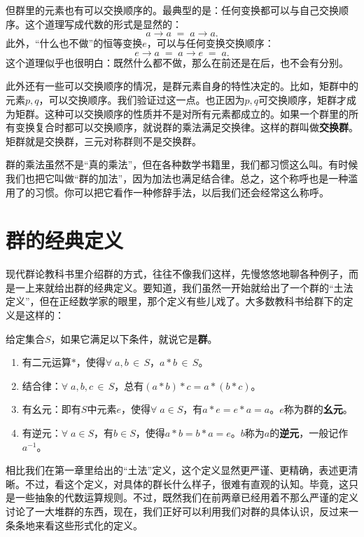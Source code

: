 \documentclass[12pt,UTF8,fontset=none]{ctexbook}
\begin{document}
但群里的元素也有可以交换顺序的。最典型的是：任何变换都可以与自己交换顺序。这个道理写成代数的形式是显然的：
$$ a\rightarrow a \; = \; a\rightarrow a.$$
此外，“什么也不做”的恒等变换$e$，可以与任何变换交换顺序：
$$ e\rightarrow a \; = \; a\rightarrow e \; = \;a.$$
这个道理似乎也很明白：既然什么都不做，那么在前还是在后，也不会有分别。

此外还有一些可以交换顺序的情况，是群元素自身的特性决定的。比如，矩群中的元素$p,q$，可以交换顺序。我们验证过这一点。也正因为$p,q$可交换顺序，矩群才成为矩群。这种可以交换顺序的性质并不是对所有元素都成立的。如果一个群里的所有变换复合时都可以交换顺序，就说群的乘法满足交换律。这样的群叫做\textbf{交换群}。矩群就是交换群，三元对称群则不是交换群。

群的乘法虽然不是“真的乘法”，但在各种数学书籍里，我们都习惯这么叫。有时候我们也把它叫做“群的加法”，因为加法也满足结合律。总之，这个称呼也是一种滥用了的习惯。你可以把它看作一种修辞手法，以后我们还会经常这么称呼。

\section{群的经典定义}

现代群论教科书里介绍群的方式，往往不像我们这样，先慢悠悠地聊各种例子，而是一上来就给出群的经典定义。要知道，我们虽然一开始就给出了一个群的“土法定义”，但在正经数学家的眼里，那个定义有些儿戏了。大多数教科书给群下的定义是这样的：
\begin{df}[\textbf{群}]
    给定集合$S$，如果它满足以下条件，就说它是\textbf{群}。
    \begin{enumerate}[label=\arabic*.]
        \item 有二元运算$\ast$，使得$\forall \;a,b\,\in\,S$，$a\ast b\,\in\,S$。
        \item 结合律：$\forall\;a,b,c\,\in\, S$，总有$(a \ast b)\ast c = a \ast (b \ast c)$。
        \item 有幺元：即有$S$中元素$e$，使得$\forall \;a\in S$，有$a\ast e = e\ast a = a$。$e$称为群的\textbf{幺元}。
        \item 有逆元：$\forall \;a\in S$，有$b\in S$，使得$a\ast b =b\ast a = e$。$b$称为$a$的\textbf{逆元}，一般记作$a^{-1}$。
    \end{enumerate}

\end{df}

相比我们在第一章里给出的“土法”定义，这个定义显然更严谨、更精确，表述更清晰。不过，看这个定义，对具体的群长什么样子，很难有直观的认知。毕竟，这只是一些抽象的代数运算规则。不过，既然我们在前两章已经用着不那么严谨的定义讨论了一大堆群的东西，现在，我们正好可以利用我们对群的具体认识，反过来一条条地来看这些形式化的定义。
\end{document}
